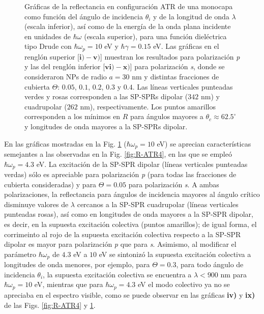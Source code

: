 \begin{figure}[b!]
\vspace*{-.5em}
	\caption{Gráficas de la reflectancia en configuración ATR de una monocapa como función del ángulo de incidencia $\theta_i$ y de la longitud de onda $\lambda$ (escala inferior), así como de la energía de la onda plana incidente en unidades de $\hbar\omega$ (escala superior), para una función dieléctrica tipo Drude con $\hbar\omega_p=10$ eV  y  $\hbar\gamma=0. 15$ eV.  Las gráficas   en el renglón superior [$\mathbf{i)-v)}$] muestran los resultados  para  polarización \emph{p} y las del renglón inferior  [$\mathbf{vi)-x)}$] para polarización  \emph{s}, donde se consideraron NPs de radio $a=30$ nm y distintas fracciones de cubierta $\Theta$: $0. 05$, $0. 1$, $0. 2$, $0. 3$ y $0. 4$. Las líneas verticales punteadas verdes y rosas corresponden a las SP-SPRs dipolar ($342$ nm) y cuadrupolar ($262$ nm), respectivamente.  Los puntos amarillos corresponden a los mínimos en $R$ para ángulos mayores a $\theta_c\approx 62.5^\circ$ y longitudes de onda mayores a la SP-SPRs dipolar. }	\label{fig:R-ATR10}	
	\end{figure}		
	
En las gráficas mostradas en la Fig. \ref{fig:R-ATR10} ($\hbar\omega_p = 10$ eV) se aprecian características semejantes a las observadas en la Fig. \ref{fig:R-ATR4}, en las que se empleó $\hbar\omega_p = 4.3$ eV. La excitación de la SP-SPR dipolar (líneas verticales punteadas verdas) sólo es apreciable para polarización \emph{p} (para todas las fracciones de cubierta consideradas) y para $\Theta = 0.05$ para polarización  \emph{s}. A ambas polarizaciones, la reflectancia para ángulos de incidencia mayores al ángulo crítico disminuye valores de $\lambda$ cercanos a la SP-SPR cuadrupolar (líneas verticales punteadas rosas), así como en longitudes de onda mayores a la SP-SPR dipolar, es decir, en la supuesta excitación colectiva  (puntos amarillos); de igual forma, el corrimeinto al rojo de la supuesta excitación colectiva respecto a la SP-SPR dipolar es mayor para polarización \emph{p} que para \emph{s}.  Asimismo, al modificar el parámetro $\hbar\omega_p$ de $4.3$ eV a $10$ eV se sintonizó la supuesta excitación colectiva a longitudes de onda menores, por ejemplo, para $\Theta = 0.3$, para todo ángulo de incidencia $\theta_i$, la supuesta excitación colectiva se encuentra a $\lambda<900$ nm para $\hbar\omega_p=10$ eV, mientras que para $\hbar\omega_p=4.3$ eV el modo colectivo ya no se apreciaba en el espectro visible, como se puede observar en las gráficas \textbf{iv)} y \textbf{ix)} de las Figs. \ref{fig:R-ATR4} y \ref{fig:R-ATR10}.

